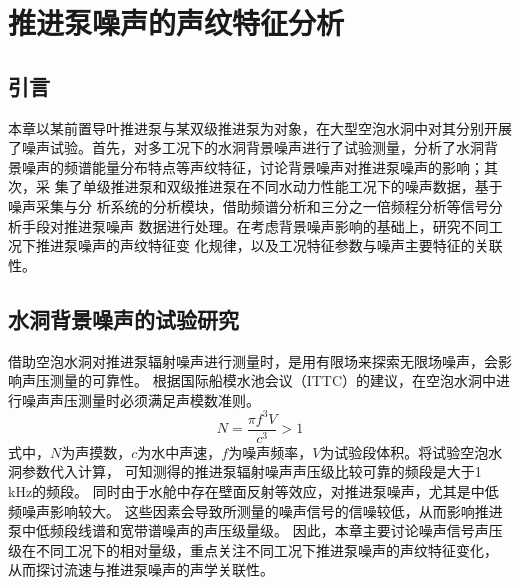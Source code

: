 \chapter{推进泵噪声的声纹特征分析}\label{ch:chapter3}
\section{引言}
\begin{comment}
本文以紧凑型前置导叶的单级推进泵和新型结构的双级推进泵为研究对象，
在大型空泡水洞中对其进行噪声试验研究。
目的在于阐明推进泵辐射噪声特性与航速之间的声学关联性，以及丰富推进泵声指纹特征的内涵。

试验中通过固定叶轮转速、改变水洞流速的方法，从而获得推进泵在不同水动力性能工况下的噪声数据。
由于水洞测试的局限性会影响推进泵中低频段辐射噪声的声压级量级，所测噪声信号的信噪比较低。
因此在研究中对多工况下的水洞背景噪声
进行了试验测量，分析了水洞背景噪声的频谱特性和特征频段能量分布，
讨论背景噪声对推进泵噪声的影响；其次，采集了单级推进泵和双级推进泵在不
同水动力性能工况下的噪声数据，基于噪声采集与分析系统的分析模块，借助频谱分析
和三分之一倍频程分析等信号分析手段对推进泵噪声数据进行处理。在考虑背景噪声影
响的基础上，研究不同工况下推进泵噪声的声纹特征变化，以及流速等与噪声的声学关
联性，探讨推进泵噪声的声纹特征。
\end{comment}
本章以某前置导叶推进泵与某双级推进泵为对象，在大型空泡水洞中对其分别开展
了噪声试验。首先，对多工况下的水洞背景噪声进行了试验测量，分析了水洞背
景噪声的频谱能量分布特点等声纹特征，讨论背景噪声对推进泵噪声的影响；其次，采
集了单级推进泵和双级推进泵在不同水动力性能工况下的噪声数据，基于噪声采集与分
析系统的分析模块，借助频谱分析和三分之一倍频程分析等信号分析手段对推进泵噪声
数据进行处理。在考虑背景噪声影响的基础上，研究不同工况下推进泵噪声的声纹特征变
化规律，以及工况特征参数与噪声主要特征的关联性。
\section{水洞背景噪声的试验研究}
借助空泡水洞对推进泵辐射噪声进行测量时，是用有限场来探索无限场噪声，会影响声压测量的可靠性。
根据国际船模水池会议（ITTC）的建议，在空泡水洞中进行噪声声压测量时必须满足声模数准则\cite{曾赛2018试验研究}。
\begin{equation}
    \label{equ:fm}
    N=\frac{\pi f^3V}{c^3} > 1
\end{equation}
式中，$N$为声摸数，$c$为水中声速，$f$为噪声频率，$V$为试验段体积。将试验空泡水洞参数代入计算，
可知测得的推进泵辐射噪声声压级比较可靠的频段是大于1 \,kHz的频段。
同时由于水舱中存在壁面反射等效应，对推进泵噪声，尤其是中低频噪声影响较大。
这些因素会导致所测量的噪声信号的信噪较低，从而影响推进泵中低频段线谱和宽带谱噪声的声压级量级。
因此，本章主要讨论噪声信号声压级在不同工况下的相对量级，重点关注不同工况下推进泵噪声的声纹特征变化，
从而探讨流速与推进泵噪声的声学关联性。

